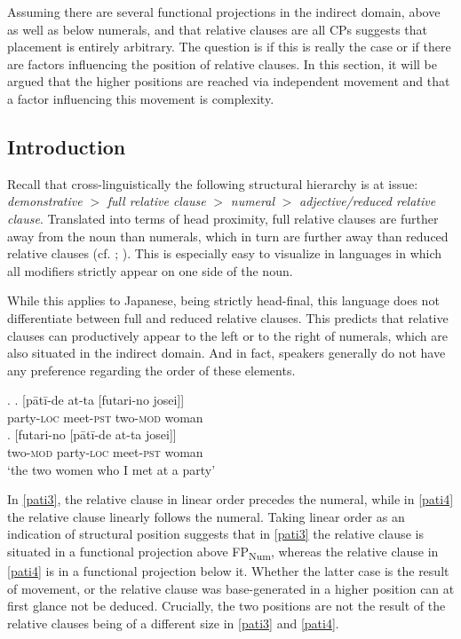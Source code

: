 Assuming there are several functional projections in the indirect domain, above as well as below numerals, and that relative clauses are all CPs suggests that placement is entirely arbitrary. The question is if this is really the case or if there are factors influencing the position of relative clauses. In this section, it will be argued that the higher positions are reached via independent movement and that a factor influencing this movement is complexity.

\subsection{Introduction}

Recall that cross-linguistically the following structural hierarchy is at issue: \textit{demonstrative} $>$ \textit{full relative clause} $>$ \textit{numeral} $>$ \textit{adjective/reduced relative clause}. Translated into terms of head proximity, full relative clauses are further away from the noun than numerals, which in turn are further away than reduced relative clauses (cf. \citealt[§ 3.5]{cinque:2020:relcl}; \citealt{cinque:2017:micro, greenberg:1963:some, hawkins:1983:word, rijkhoff:2002:noun}). This is especially easy to visualize in languages in which all modifiers strictly appear on one side of the noun.

While this applies to Japanese, being strictly head-final, this language does not differentiate between full and reduced relative clauses. This predicts that relative clauses can productively appear to the left or to the right of numerals, which are also situated in the indirect domain. And in fact, speakers generally do not have any preference regarding the order of these elements.

\ex. \label{pati} \ag. [pātī-de at-ta [futari-no josei]]\\
party-\textsc{loc} meet-\textsc{pst} two-\textsc{mod} woman \label{pati3}\\
\bg. [futari-no [pātī-de at-ta josei]]\\
two-\textsc{mod} party-\textsc{loc} meet-\textsc{pst} woman\\
`the two women who I met at a party' \label{pati4}

In \ref{pati3}, the relative clause in linear order precedes the numeral, while in \ref{pati4} the relative clause linearly follows the numeral. Taking linear order as an indication of structural position suggests that in \ref{pati3} the relative clause is situated in a functional projection above FP\textsubscript{Num}, whereas the relative clause in \ref{pati4} is in a functional projection below it. Whether the latter case is the result of movement, or the relative clause was base-generated in a higher position can at first glance not be deduced. Crucially, the two positions are not the result of the relative clauses being of a different size in \ref{pati3} and \ref{pati4}.

